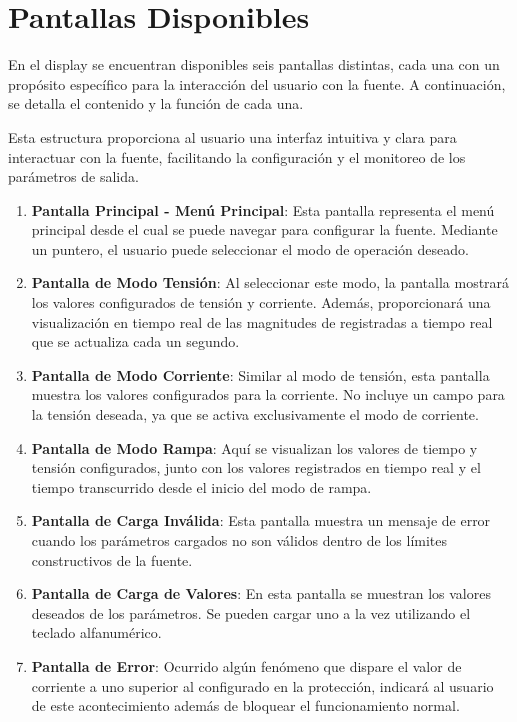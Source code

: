\section{Pantallas Disponibles} 
En el display se encuentran disponibles seis pantallas distintas, cada una con un propósito específico para la interacción del usuario con la fuente. A continuación, se detalla el contenido y la función de cada una. \par 
Esta estructura proporciona al usuario una interfaz intuitiva y clara para interactuar con la fuente, facilitando la configuración y el monitoreo de los parámetros de salida.\par 
\begin{enumerate}
    \item \textbf{Pantalla Principal - Menú Principal}: Esta pantalla representa el menú principal desde el cual se puede navegar para configurar la fuente. Mediante un puntero, el usuario puede seleccionar el modo de operación deseado.
    \item \textbf{Pantalla de Modo Tensión}: Al seleccionar este modo, la pantalla mostrará los valores configurados de tensión y corriente. Además, proporcionará una visualización en tiempo real de las magnitudes de registradas a tiempo real que se actualiza cada un segundo.
    \item \textbf{Pantalla de Modo Corriente}: Similar al modo de tensión, esta pantalla muestra los valores configurados para la corriente. No incluye un campo para la tensión deseada, ya que se activa exclusivamente el modo de corriente.
    \item \textbf{Pantalla de Modo Rampa}: Aquí se visualizan los valores de tiempo y tensión configurados, junto con los valores registrados en tiempo real y el tiempo transcurrido desde el inicio del modo de rampa.
    \item \textbf{Pantalla de Carga Inválida}: Esta pantalla muestra un mensaje de error cuando los parámetros cargados no son válidos dentro de los límites constructivos de la fuente.
    \item \textbf{Pantalla de Carga de Valores}: En esta pantalla se muestran los valores deseados de los parámetros. Se pueden cargar uno a la vez utilizando el teclado alfanumérico.
    \item \textbf{Pantalla de Error}: Ocurrido algún fenómeno que dispare el valor de corriente a uno superior al configurado en la protección, indicará al usuario de este acontecimiento además de bloquear el funcionamiento normal.
\end{enumerate}

